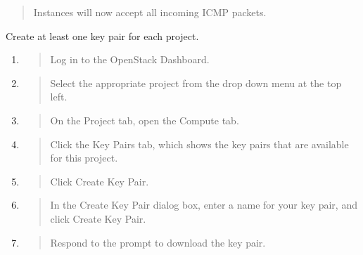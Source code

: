 \begin{quote}
Instances will now accept all incoming ICMP packets.
\end{quote}

\label{add-a-key-pair}

Create at least one key pair for each project.

\begin{enumerate}
\def\labelenumi{\arabic{enumi}.}
\item
  \begin{quote}
  Log in to the \gls{OpenStack Dashboard}.
  \end{quote}
\item
  \begin{quote}
  Select the appropriate project from the drop down menu at the top
  left.
  \end{quote}
\item
  \begin{quote}
  On the Project tab, open the Compute tab.
  \end{quote}
\item
  \begin{quote}
  Click the Key Pairs tab, which shows the key pairs that are available
  for this project.
  \end{quote}
\item
  \begin{quote}
  Click Create Key Pair.
  \end{quote}
\item
  \begin{quote}
  In the Create Key Pair dialog box, enter a name for your key pair, and
  click Create Key Pair.
  \end{quote}
\item
  \begin{quote}
  Respond to the prompt to download the key pair.
  \end{quote}
\end{enumerate}

\label{import-a-key-pair}

